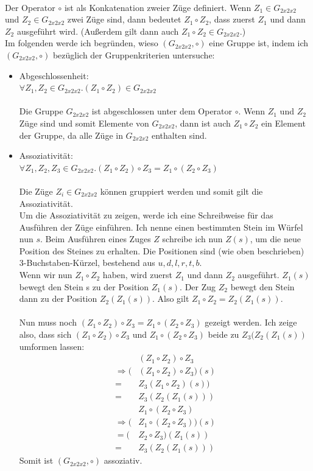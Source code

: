 \documentclass[12pt,a4paper, usenames, dvipsnames]{scrartcl}
\begin{document}
\\
Der Operator $\circ$ ist als Konkatenation zweier Züge definiert. Wenn $Z_1 \in G_{2x2x2}$ und $Z_2 \in G_{2x2x2}$ zwei Züge sind, dann bedeutet $Z_1 \circ Z_2$, dass zuerst $Z_1$ und dann $Z_2$ ausgeführt wird. (Außerdem gilt dann auch $Z_1 \circ Z_2 \in G_{2x2x2}$.) \\
Im folgenden werde ich begründen, wieso $(G_{2x2x2}, \circ)$ eine Gruppe ist, indem ich $(G_{2x2x2}, \circ)$ bezüglich der Gruppenkriterien untersuche: \\
\begin{itemize}
\item Abgeschlossenheit: \\ 
$\forall Z_1,Z_2 \in G_{2x2x2} .  (Z_1 \circ Z_2) \in G_{2x2x2} $ \\
\\
Die Gruppe $G_{2x2x2}$ ist abgeschlossen unter dem Operator $\circ$. Wenn $Z_1 $ und $Z_2$ Züge sind und somit Elemente von $G_{2x2x2}$, dann ist auch $Z_1 \circ Z_2$ ein Element der Gruppe, da alle Züge in $G_{2x2x2}$ enthalten sind. 

\item Assoziativität:\\ 
$\forall Z_1,Z_2,Z_3 \in G_{2x2x2}.(Z_1 \circ Z_2) \circ Z_3 = Z_1 \circ (Z_2 \circ Z_3)$ \\
\\
Die Züge $Z_i \in G_{2x2x2}$ können gruppiert werden und somit gilt die Assoziativität. \\
Um die Assoziativität zu zeigen, werde ich eine Schreibweise für das Ausführen der Züge einführen. Ich nenne einen bestimmten Stein im Würfel nun $s$. Beim Ausführen eines Zuges $Z$ schreibe ich nun $Z(s)$, um die neue Position des Steines zu erhalten. Die Positionen sind (wie oben beschrieben) 3-Buchstaben-Kürzel, bestehend aus $u, d, l, r, t, b$. \\
Wenn wir nun $Z_1 \circ Z_2 $ haben, wird zuerst $Z_1$ und dann $Z_2$ ausgeführt. $Z_1(s)$ bewegt den Stein s zu der Position $Z_1(s)$. Der Zug $Z_2$ bewegt den Stein dann zu der Position $Z_2(Z_1(s))$. Also gilt $Z_1 \circ Z_2 = Z_2(Z_1(s))$. \\
\\
Nun muss noch $(Z_1 \circ Z_2) \circ Z_3 = Z_1 \circ (Z_2 \circ Z_3)$ gezeigt werden. Ich zeige also, dass sich $(Z_1 \circ Z_2) \circ Z_3$ und $Z_1 \circ (Z_2 \circ Z_3)$ beide zu $Z_3(Z_2(Z_1(s))$ umformen lassen: \\
\begin{align*}
& (Z_1 \circ Z_2) \circ Z_3  \\
\Rightarrow (&(Z_1 \circ Z_2) \circ Z_3)(s) \\
= & Z_3(Z_1 \circ Z_2)(s)) \\
= & Z_3(Z_2(Z_1(s)))  
\end{align*}
\begin{align*}
&Z_1 \circ (Z_2 \circ Z_3) \\
\Rightarrow (&Z_1 \circ (Z_2 \circ Z_3))(s) \\
= (&Z_2 \circ Z_3)(Z_1(s)) \\
= \ \ & Z_3(Z_2(Z_1(s)))  
\end{align*}
Somit ist $(G_{2x2x2}, \circ)$ assoziativ.


\end{itemize}
\end{document}
